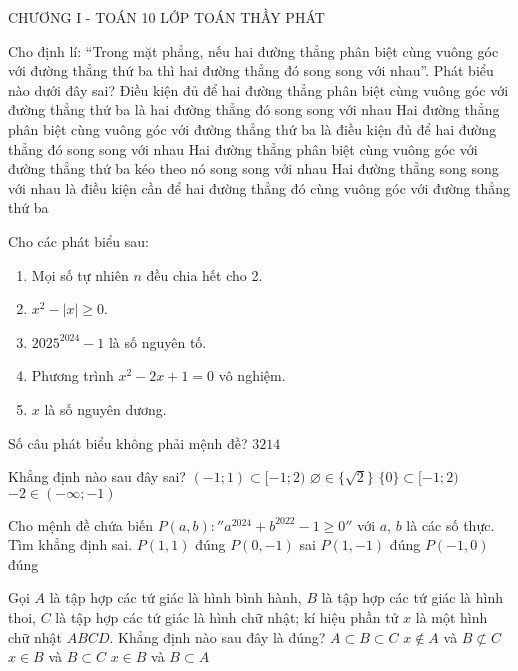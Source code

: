 \begin{name}
	{\tenchude}
	{CHƯƠNG I - TOÁN 10}
	{LỚP TOÁN THẦY PHÁT}
	{ }
\end{name}
\begin{ex}
	Cho định lí: “Trong mặt phẳng, nếu hai đường thẳng phân biệt cùng vuông góc với đường thẳng thứ ba thì hai đường thẳng đó song song với nhau”. Phát biểu nào dưới đây sai?
	\choice
	{Điều kiện đủ để hai đường thẳng phân biệt cùng vuông góc với đường thẳng thứ ba là hai đường thẳng đó song song với nhau}
	{Hai đường thẳng phân biệt cùng vuông góc với đường thẳng thứ ba là điều kiện đủ để hai đường thẳng đó song song với nhau}
	{Hai đường thẳng phân biệt cùng vuông góc với đường thẳng thứ ba kéo theo nó song song với nhau}
	{Hai đường thẳng song song với nhau là điều kiện cần để hai đường thẳng đó cùng vuông góc với đường thẳng thứ ba}
\end{ex}
\begin{ex}
	Cho các phát biểu sau:
	\begin{enumerate}
		\item Mọi số tự nhiên $n$ đều chia hết cho 2.
		\item $x^2- |x|\ge 0$.
		\item $2025^{2024}-1$ là số nguyên tố.
		\item Phương trình $x^2-2x+1=0$ vô nghiệm.
		\item $x$ là số nguyên dương.
	\end{enumerate}
	Số câu phát biểu không phải mệnh đề?
	\choice
	{$3$}{$2$}{$1$}{$4$}
\end{ex}
\begin{ex}
	Khẳng định nào sau đây sai?
	\choice
	{$(-1;1)\subset [-1;2)$}
	{$\varnothing \in \{\sqrt{2}\}$}
	{$\{0\}\subset [-1;2)$}
	{$-2\in \left(-\infty ;-1\right)$}
\end{ex}
\begin{ex}
	Cho mệnh đề chứa biến $P\left(a,b\right)\colon''{a^{2024}}+{b^{2022}}-1\ge 0''$ với $a$, $b$ là các số thực. Tìm khẳng định sai.
	\choice
	{$P\left(1{,}1\right)$ đúng}
	{$P\left(0,-1\right)$ sai}
	{$P\left(1,-1\right)$ đúng}
	{$P\left(-1{,}0\right)$ đúng}
\end{ex}
\begin{ex}
	Gọi $A$ là tập hợp các tứ giác là hình bình hành, $B$ là tập hợp các tứ giác là hình thoi, $C$ là tập hợp các tứ giác là hình chữ nhật; kí hiệu phần tử $x$ là một hình chữ nhật $ABCD$. Khẳng định nào sau đây là đúng?
	\choice
	{$A\subset B\subset C$}
	{$x\notin A$ và $B\not\subset C$}
	{$x\in B$ và $B\subset C$}
	{$x\in B$ và $B\subset A$}
\end{ex}
